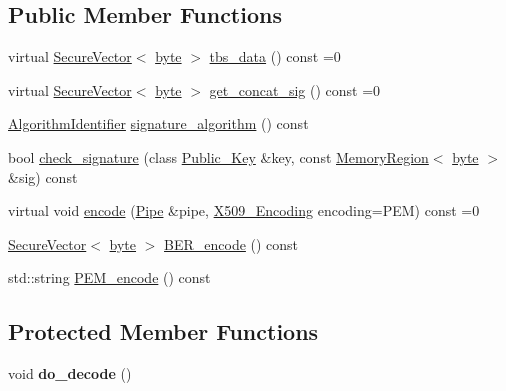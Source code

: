 \subsection*{Public Member Functions}
\begin{DoxyCompactItemize}
\item 
virtual \hyperlink{classBotan_1_1SecureVector}{Secure\-Vector}$<$ \hyperlink{namespaceBotan_a7d793989d801281df48c6b19616b8b84}{byte} $>$ \hyperlink{classBotan_1_1EAC__Signed__Object_a024f30b08d7a83b328ec76d75e3c18a2}{tbs\-\_\-data} () const =0
\item 
virtual \hyperlink{classBotan_1_1SecureVector}{Secure\-Vector}$<$ \hyperlink{namespaceBotan_a7d793989d801281df48c6b19616b8b84}{byte} $>$ \hyperlink{classBotan_1_1EAC__Signed__Object_abdccc2793d07b85bdba0b20733d569c8}{get\-\_\-concat\-\_\-sig} () const =0
\item 
\hyperlink{classBotan_1_1AlgorithmIdentifier}{Algorithm\-Identifier} \hyperlink{classBotan_1_1EAC__Signed__Object_a7abc66229971791494e203a744634be7}{signature\-\_\-algorithm} () const 
\item 
bool \hyperlink{classBotan_1_1EAC__Signed__Object_a404334683880964094f879f10504cc6c}{check\-\_\-signature} (class \hyperlink{classBotan_1_1Public__Key}{Public\-\_\-\-Key} \&key, const \hyperlink{classBotan_1_1MemoryRegion}{Memory\-Region}$<$ \hyperlink{namespaceBotan_a7d793989d801281df48c6b19616b8b84}{byte} $>$ \&sig) const 
\item 
virtual void \hyperlink{classBotan_1_1EAC__Signed__Object_af96951a0a562640e45ed2bc08edf6205}{encode} (\hyperlink{classBotan_1_1Pipe}{Pipe} \&pipe, \hyperlink{namespaceBotan_a53759b4ed1fb93549f307fcf68729d2f}{X509\-\_\-\-Encoding} encoding=P\-E\-M) const =0
\item 
\hyperlink{classBotan_1_1SecureVector}{Secure\-Vector}$<$ \hyperlink{namespaceBotan_a7d793989d801281df48c6b19616b8b84}{byte} $>$ \hyperlink{classBotan_1_1EAC__Signed__Object_a49b5cff327a12558a96b7cecf73d62c4}{B\-E\-R\-\_\-encode} () const 
\item 
std\-::string \hyperlink{classBotan_1_1EAC__Signed__Object_accf002425faa1c05074e9776d3718304}{P\-E\-M\-\_\-encode} () const 
\end{DoxyCompactItemize}
\subsection*{Protected Member Functions}
\begin{DoxyCompactItemize}
\item 
\hypertarget{classBotan_1_1EAC__Signed__Object_a6e937d948f759665562f9bb02d56c536}{void {\bfseries do\-\_\-decode} ()}\label{classBotan_1_1EAC__Signed__Object_a6e937d948f759665562f9bb02d56c536}

\end{DoxyCompactItemize}

